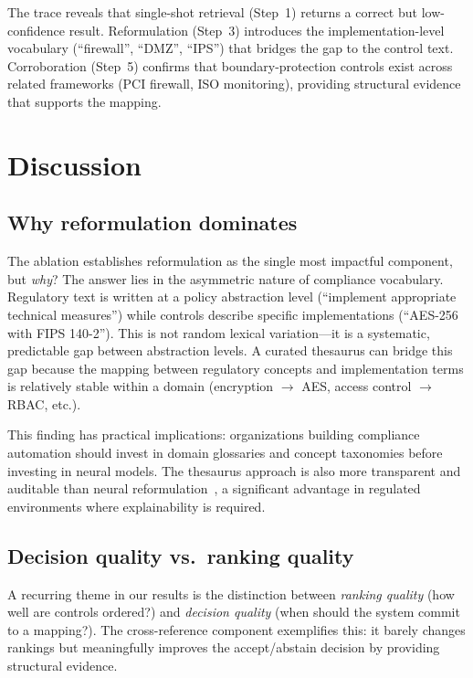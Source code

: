 \documentclass[a4paper,fleqn]{cas-sc}
\begin{document}
The trace reveals that single-shot retrieval (Step~1) returns a correct but low-confidence result.
Reformulation (Step~3) introduces the implementation-level vocabulary (``firewall'', ``DMZ'', ``IPS'') that bridges the gap to the control text.
Corroboration (Step~5) confirms that boundary-protection controls exist across related frameworks (PCI firewall, ISO monitoring), providing structural evidence that supports the mapping.


\section{Discussion}
\label{sec:discussion}

\subsection{Why reformulation dominates}

The ablation establishes reformulation as the single most impactful component, but \emph{why}?
The answer lies in the asymmetric nature of compliance vocabulary.
Regulatory text is written at a policy abstraction level (``implement appropriate technical measures'') while controls describe specific implementations (``AES-256 with FIPS 140-2'').
This is not random lexical variation---it is a systematic, predictable gap between abstraction levels.
A curated thesaurus can bridge this gap because the mapping between regulatory concepts and implementation terms is relatively stable within a domain (encryption $\rightarrow$ AES, access control $\rightarrow$ RBAC, etc.).

This finding has practical implications: organizations building compliance automation should invest in domain glossaries and concept taxonomies before investing in neural models.
The thesaurus approach is also more transparent and auditable than neural reformulation~\citep{Nogueira2019}, a significant advantage in regulated environments where explainability is required.

\subsection{Decision quality vs.\ ranking quality}

A recurring theme in our results is the distinction between \emph{ranking quality} (how well are controls ordered?) and \emph{decision quality} (when should the system commit to a mapping?).
The cross-reference component exemplifies this: it barely changes rankings but meaningfully improves the accept/abstain decision by providing structural evidence.
\end{document}
